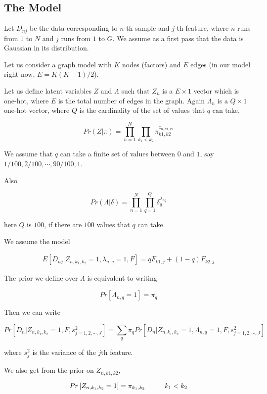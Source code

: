 \documentclass[12pt]{article}
\begin{document}
\subsection{The Model}

Let $D_{nj}$ be the data corresponding to $n$-th sample and $j$-th feature, where $n$ runs from $1$ to $N$ and $j$ runs from $1$ to $G$. We assume as a first pass that the data is Gaussian in its distribution. 

Let us consider a graph model with $K$ nodes (factors) and $E$ edges (in our model right now, $E=K(K-1)/2$).

Let us define latent variables $Z$ and $\Lambda$ such that $Z_{n}$ is a $E \times 1$ vector which is one-hot, where $E$ is the total number of edges in the graph. Again $\Lambda_{n}$ is a $Q \times 1$ one-hot vector, where $Q$ is the cardinality of the set of values that $q$ can take. 

$$  Pr (Z |  \pi )  = \prod_{n=1}^{N} \prod_{k_1 < k_2} \pi_{k1,k2}^{z_{n,k1,k2}} $$

We assume that $q$ can take a finite set of values between $0$ and $1$, 
say $1/100, 2/100, \cdots, 90/100, 1$.

Also

$$  Pr (\Lambda | \delta ) = \prod_{n=1}^{N} \prod_{q=1}^{Q} \delta_{q}^{\lambda_{nq}} $$

here $Q$ is $100$, if there are $100$ values that $q$ can take.

We assume the model 

\begin{eqnarray}
 E \left [ D_{nj} | Z_{n, k_1, k_2} = 1, \lambda_{n,q}=1, F \right] = q F_{k1,j} + (1-q) F_{k2,j}
\end{eqnarray}

The prior we define over $\Lambda$ is equivalent to writing 

$$ Pr \left [ \Lambda_{n, q} = 1 \right ] = \pi_{q}  $$

Then we can write 

$$ Pr \left [ D_{n} | Z_{n, k_1, k_2}=1, F, s^2_{j=1,2,\cdots,J} \right ] = \sum_{q} \pi_{q} Pr \left [D_{n} | Z_{n, k_1, k_2}=1, \Lambda_{n, q}=1, F, s^2_{j=1,2,\cdots,J} \right ] $$

where $s^2_{j}$ is the variance of the $j$th feature.

We also get from the prior on $Z_{n,k1,k2}$,

$$ Pr \left [ Z_{n, k_1, k_2} = 1 \right ] = \pi_{k_1,k_2} \hspace{1 cm} k_1 < k_2$$
\end{document}
